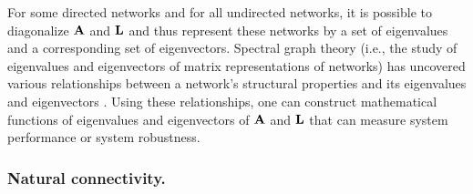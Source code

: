 \documentclass{comnet-mod}
\begin{document}
For some directed networks and for all undirected networks, it is possible to diagonalize $\bf A$ and $\bf L$ and thus represent these networks by a set of eigenvalues and a corresponding set of eigenvectors. Spectral graph theory (i.e., the study of eigenvalues and eigenvectors of matrix representations of networks) has uncovered various relationships between a network's structural properties and its eigenvalues and eigenvectors \cite{VanMieghem2023}. Using these relationships, one can construct mathematical functions of eigenvalues and eigenvectors of $\bf A$ and $\bf L$ that can measure system performance or system robustness. 


\subsubsection{Natural connectivity.}
\end{document}
